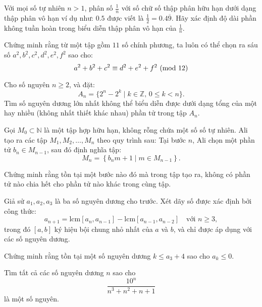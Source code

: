 \documentclass[./m.tex]{subfiles}
\begin{document}
\begin{problem}\label{problem:IND-2015-N2}
	Với mọi số tự nhiên \( n > 1 \), phân số \( \frac{1}{n} \) với số chữ số thập phân hữu hạn dưới dạng thập phân vô hạn 
	ví dụ như: \( 0.5 \) được viết là \( \frac{1}{2} = 0.4\overline{9} \).
	Hãy xác định độ dài phần không tuần hoàn trong biểu diễn thập phân vô hạn của \( \frac{1}{n} \).
\end{problem}

\begin{problem}\label{problem:IND-2015-N6}
	Chứng minh rằng từ một tập gồm \( 11 \) số chính phương, ta luôn có thể chọn ra sáu số \( a^2, b^2, c^2, d^2, e^2, f^2 \) sao cho:
	\[
		a^2 + b^2 + c^2 \equiv d^2 + e^2 + f^2 \ (\mathrm{mod}\ 12)
	\]
\end{problem}

\begin{problem}\label{problem:IND-2015-TST2-P1}
	Cho số nguyên \( n \geq 2 \), và đặt:
	\[
		A_n = \{2^n - 2^k \mid k \in \mathbb{Z},\, 0 \leq k < n \}.
	\]
	Tìm số nguyên dương lớn nhất không thể biểu diễn được dưới dạng tổng của một hay nhiều (không nhất thiết khác nhau) phần tử trong tập \( A_n \).
\end{problem}

\begin{problem}\label{problem:IRN-2015-N2}
	Gọi \( M_0 \subset \mathbb{N} \) là một tập hợp hữu hạn, không rỗng chứa một số số tự nhiên.
	Ali tạo ra các tập \( M_1, M_2, \dots, M_n \) theo quy trình sau:
	Tại bước \( n \), Ali chọn một phần tử \( b_n \in M_{n-1} \), sau đó định nghĩa tập:
	\[
		M_n = \left\{ b_n m + 1 \mid m \in M_{n-1} \right\}.
	\]

	Chứng minh rằng tồn tại một bước nào đó mà trong tập tạo ra, không có phần tử nào chia hết cho phần tử nào khác trong cùng tập.
\end{problem}

\begin{problem}\label{problem:IRN-2015-TST-D3-P2}
	Giả sử \( a_1, a_2, a_3 \) là ba số nguyên dương cho trước. Xét dãy số được xác định bởi công thức:
	\[
		a_{n+1} = \text{lcm}[a_n, a_{n-1}] - \text{lcm}[a_{n-1}, a_{n-2}] \quad \text{với } n \geq 3,
	\]
	trong đó \( [a, b] \) ký hiệu bội chung nhỏ nhất của \( a \) và \( b \), và chỉ được áp dụng với các số nguyên dương.

	Chứng minh rằng tồn tại một số nguyên dương \( k \leq a_3 + 4 \) sao cho \( a_k \leq 0 \).
\end{problem}

\begin{problem}\label{problem:JPN-2015-MO-P1}
	Tìm tất cả các số nguyên dương \( n \) sao cho 
	\[
		\frac{10^n}{n^3 + n^2 + n + 1}
	\]
	là một số nguyên.
\end{problem}
\end{document}
